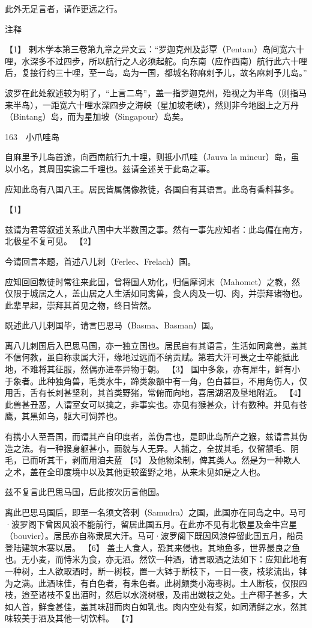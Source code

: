 \documentclass[12pt,UTF8]{ctexbook}
\begin{document}
此外无足言者，请作更远之行。

注释

【1】 剌木学本第三卷第九章之异文云：“罗迦克州及彭覃（Pentam）岛间宽六十哩，水深多不过四步，所以航行之人必须起舵。向东南（应作西南）航行此六十哩后，复接行约三十哩，至一岛，岛为一国，都城名称麻剌予儿，故名麻剌予儿岛。”

波罗在此处叙述较为明了，“上言二岛”，盖一指罗迦克州，殆视之为半岛（则指马来半岛），一距宽六十哩水深四步之海峡（星加坡老峡），然则非今地图上之万丹（Bintang）岛，而为星加坡（Singapour）岛矣。





163　小爪哇岛

自麻里予儿岛首途，向西南航行九十哩，则抵小爪哇（Jauva la mineur）岛，虽以小名，其周围实逾二千哩也。兹请全述关于此岛之事。

应知此岛有八国八王。居民皆属偶像教徒，各国自有其语言。此岛有香料甚多。





【1】


兹请为君等叙述关系此八国中大半数国之事。然有一事先应知者：此岛偏在南方，北极星不复可见。 【2】

今请回言本题，首述八儿剌（Ferlec、Frelach）国。

应知回回教徒时常往来此国，曾将国人劝化，归信摩诃末（Mahomet）之教，然仅限于城居之人，盖山居之人生活如同禽兽，食人肉及一切、肉，并崇拜诸物也。此辈早起，崇拜其首见之物，终日皆然。

既述此八儿剌国毕，请言巴思马（Basma、Basman）国。

离八儿剌国后入巴思马国，亦一独立国也。居民自有其语言，生活如同禽兽，盖其不信何教，虽自称隶属大汗，缘地过远而不纳贡赋。第若大汗可畏之士卒能抵此地，不难将其征服，然偶亦进奉异物于朝。 【3】 国中多象，亦有犀牛，鲜有小于象者。此种独角兽，毛类水牛，蹄类象额中有一角，色白甚巨，不用角伤人，仅用舌，舌有长剌甚坚利，其首类野猪，常俯而向地，喜居湖沼及垦地附近。 【4】 此兽甚丑恶，人谓室女可以擒之，非事实也。亦见有猴甚众，计有数种。并见有苍鹰，其黑如乌，躯大可饲养也。

有携小人至吾国，而谓其产自印度者，盖伪言也，是即此岛所产之猴，兹请言其伪造之法。有一种猴身躯甚小，面貌与人无异。人捕之，全拔其毛，仅留颔毛、阴毛，已而听其干，剥而用洎夫蓝 【5】 及他物染制，俾其类人。然是为一种欺人之术，盖在全印度境中以及其他更较蛮野之地，从来未见如是之人也。

兹不复言此巴思马国，后此按次历言他国。

离此巴思马国后，即至一名须文答剌（Samudra）之国，此国亦在同岛之中。马可·波罗阁下曾因风浪不能前行，留居此国五月。在此亦不见有北极星及金牛宫星（bouvier）。居民亦自称隶属大汗。马可·波罗阁下既因风浪停留此国五月，船员登陆建筑木寨以居。 【6】 盖土人食人，恐其来侵也。其地鱼多，世界最良之鱼也。无小麦，而恃米为食，亦无酒。然饮一种酒，请言取酒之法如下：应知此地有一种树，土人欲取酒时，断一树枝，置一大钵于断枝下，一日一夜，枝浆流出，钵为之满。此酒味佳，有白色者，有朱色者。此树颇类小海枣树。土人断枝，仅限四枝，迨至诸枝不复出酒时，然后以水浇树根，及甫出嫩枝之处。土产椰子甚多，大如人首，鲜食甚佳，盖其味甜而肉白如乳也。肉内空处有浆，如同清鲜之水，然其味较美于酒及其他一切饮料。 【7】
\end{document}
